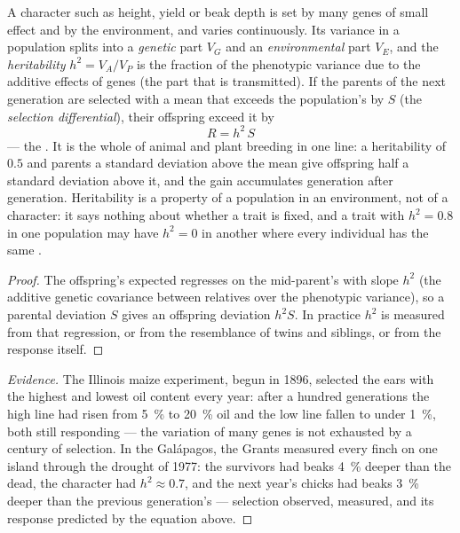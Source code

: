 \begin{theorem}\label{thm:b2:population-genetics:heritability}
A character such as height, yield or beak depth is set by many
genes of small effect and by the environment, and varies
continuously. Its variance in a population splits into a
\emph{genetic} part $V_G$ and an \emph{environmental} part $V_E$, and
the \emph{heritability} $h^{2} = V_A/V_P$ is the fraction of the
phenotypic variance due to the additive effects of genes (the part
that is transmitted). If the parents of the next generation are
selected with a mean that exceeds the population's by $S$ (the
\emph{selection differential}), their offspring exceed it by
\[
R = h^{2}\,S
\]
--- the \emph{}. It is the whole of animal and
plant breeding in one line: a heritability of $0.5$ and parents a
standard deviation above the mean give offspring half a standard
deviation above it, and the gain accumulates generation after
generation. Heritability is a property of a population in an
environment, not of a character: it says nothing about whether a
trait is fixed, and a trait with $h^{2} = 0.8$ in one population may
have $h^{2} = 0$ in another where every individual has the same
.
\end{theorem}
\begin{proof}
The offspring's expected  regresses on the mid-parent's
with slope $h^{2}$ (the additive genetic covariance between
relatives over the phenotypic variance), so a parental deviation $S$
gives an offspring deviation $h^{2}S$. In practice $h^{2}$ is
measured from that regression, or from the resemblance of twins and
siblings, or from the response itself.
\end{proof}
\begin{proof}[Evidence]
The Illinois maize experiment, begun in 1896, selected the ears with
the highest and lowest oil content every year: after a hundred
generations the high line had risen from \qty{5}{\%} to \qty{20}{\%}
oil and the low line fallen to under \qty{1}{\%}, both still
responding --- the variation of many genes is not exhausted by a
century of selection. In the Galápagos, the Grants measured every
finch on one island through the drought of 1977: the survivors had
beaks \qty{4}{\%} deeper than the dead, the character had $h^{2}
\approx 0.7$, and the next year's chicks had beaks
\qty{3}{\%} deeper than the previous generation's --- selection
observed, measured, and its response predicted by the equation
above.
\end{proof}

